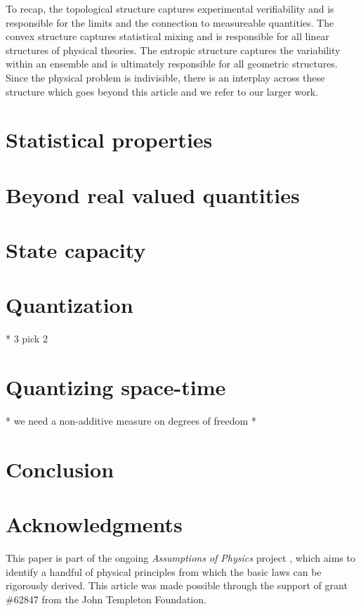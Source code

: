\documentclass[10pt,twocolumn, nofootinbib]{revtex4-2}
\begin{document}
To recap, the topological structure captures experimental verifiability and is responsible for the limits and the connection to measureable quantities. The convex structure captures statistical mixing and is responsible for all linear structures of physical theories. The entropic structure captures the variability within an ensemble and is ultimately responsible for all geometric structures. Since the physical problem is indivisible, there is an interplay across these structure which goes beyond this article and we refer to our larger work.



\section{Statistical properties}

\section{Beyond real valued quantities}


\section{State capacity}

\section{Quantization}
* 3 pick 2

\section{Quantizing space-time}
* we need a non-additive measure on degrees of freedom
*

\section{Conclusion}



\section*{Acknowledgments}
This paper is part of the ongoing \textit{Assumptions of Physics} project \cite{aop-book}, which aims to identify a handful of physical principles from which the basic laws can be rigorously derived. This article was made possible through the support of grant \#62847 from the John Templeton Foundation.




\newcommand{\pj}[1] {\underbar{$#1$}}
\end{document}
